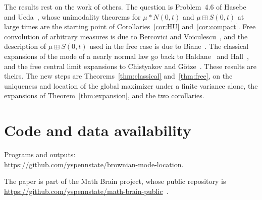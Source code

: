 \documentclass[11pt]{amsart}
\theoremstyle{definition}
\begin{document}
The results rest on the work of others. The question is Problem~4.6 of Hasebe and Ueda~\cite{HU}, whose unimodality theorems for $\mu*N(0,t)$ and $\mu\boxplus S(0,t)$ at large times are the starting point of Corollaries~\ref{cor:HU} and~\ref{cor:compact}. Free convolution of arbitrary measures is due to Bercovici and Voiculescu~\cite{BV}, and the description of $\mu\boxplus S(0,t)$ used in the free case is due to Biane~\cite{Biane}. The classical expansions of the mode of a nearly normal law go back to Haldane~\cite{Haldane} and Hall~\cite{Hall}, and the free central limit expansions to Chistyakov and G\"otze~\cite{CG}. These results are theirs. The new steps are Theorems~\ref{thm:classical} and~\ref{thm:free}, on the uniqueness and location of the global maximizer under a finite variance alone, the expansions of Theorem~\ref{thm:expansion}, and the two corollaries.

\section*{Code and data availability}
Programs and outputs:\\
\url{https://github.com/yspennstate/brownian-mode-location}.

The paper is part of the Math Brain project, whose public repository is
\url{https://github.com/yspennstate/math-brain-public}~\cite{MathBrainRepo}.
\end{document}
